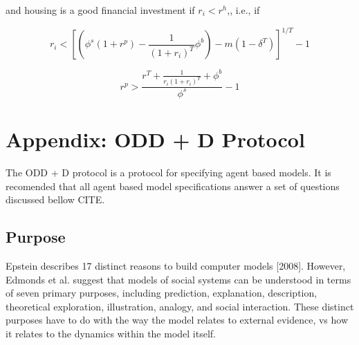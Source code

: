 and housing is a good financial investment if $r_i<r^h$,, i.e., if

\[r_i< \left[ \left(\phi^s  (1+r^p)-\frac{1}{(1+r_i)^T}\phi^b\right)      -m\left(1- \delta^T\right) \right]^{1/T}-1\]


\[r^p>\frac{r^T+ \frac{1}{r_i(1+r_i)^T}+\phi^b}{\phi^s}-1\]


\chapter*{Appendix: ODD + D Protocol}

The ODD + D protocol is a protocol for specifying agent based models. It is recomended that all agent based model specifications answer a set of questions discussed bellow CITE.

\section*{Purpose}

Epstein describes 17 distinct reasons to build computer models [2008]. However, Edmonds et al. suggest that models of social systems can be understood in terms of seven primary purposes, including prediction, explanation, description, theoretical exploration, illustration, analogy, and social interaction. These distinct purposes have to do with the way the model relates to external evidence, vs how it relates to the dynamics within the model itself. 

